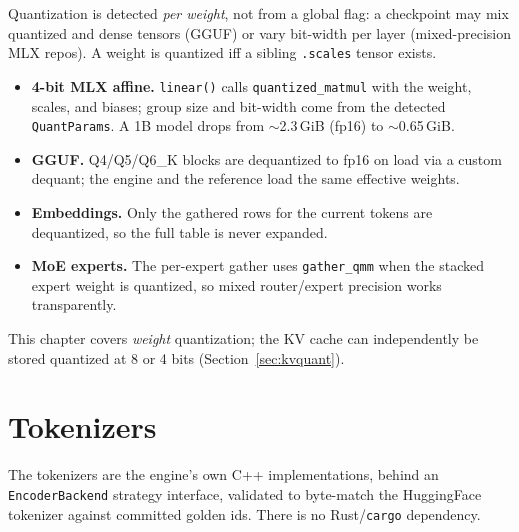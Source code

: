 \documentclass[11pt,a4paper]{report}
\newcommand{\code}[1]{\texttt{#1}}
\begin{document}
Quantization is detected \emph{per weight}, not from a global flag: a checkpoint may
mix quantized and dense tensors (GGUF) or vary bit-width per layer (mixed-precision
MLX repos). A weight is quantized iff a sibling \code{.scales} tensor exists.

\begin{itemize}[nosep]
  \item \textbf{4-bit MLX affine.} \code{linear()} calls \code{quantized\_matmul}
        with the weight, scales, and biases; group size and bit-width come from the
        detected \code{QuantParams}. A 1B model drops from $\sim$2.3\,GiB (fp16) to
        $\sim$0.65\,GiB.
  \item \textbf{GGUF.} Q4/Q5/Q6\_K blocks are dequantized to fp16 on load via a
        custom dequant; the engine and the reference load the same effective
        weights.
  \item \textbf{Embeddings.} Only the gathered rows for the current tokens are
        dequantized, so the full table is never expanded.
  \item \textbf{MoE experts.} The per-expert gather uses \code{gather\_qmm} when the
        stacked expert weight is quantized, so mixed router/expert precision works
        transparently.
\end{itemize}

This chapter covers \emph{weight} quantization; the KV cache can independently be
stored quantized at 8 or 4 bits (Section~\ref{sec:kvquant}).

\chapter{Tokenizers}
\label{ch:tok}

The tokenizers are the engine's own C++ implementations, behind an
\code{EncoderBackend} strategy interface, validated to byte-match the HuggingFace
tokenizer against committed golden ids. There is no Rust/\code{cargo} dependency.
\end{document}
